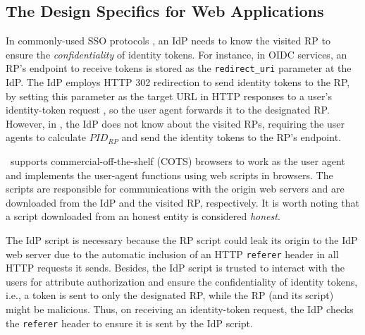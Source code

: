 \subsection{The Design Specifics for Web Applications}
\label{sec:web-design}

In commonly-used SSO protocols \cite{OpenIDConnect,rfc6749, SAML, SAMLIdentifier},
an IdP needs to know the visited RP to ensure the \emph{confidentiality} of identity tokens. For instance, in OIDC services, an RP's endpoint to receive tokens is stored as the \verb+redirect_uri+ parameter at the IdP. The IdP employs HTTP 302 redirection to send identity tokens to the RP, by setting this parameter as the target URL in HTTP responses to a user's identity-token request \cite{OpenIDConnect}, so the user agent forwards it to the designated RP.
However, in \usso, the IdP does not know about the visited RPs, requiring the user agents to calculate $PID_{RP}$ and send the identity tokens to the RP's endpoint.

\usso~supports commercial-off-the-shelf (COTS) browsers to work as the user agent and implements the user-agent functions using web scripts in browsers. The scripts are responsible for communications with the origin web servers and are downloaded from the IdP and the visited RP, respectively. It is worth noting that a script downloaded from an honest entity is considered \emph{honest}.

The IdP script is necessary because the RP script could leak its origin to the IdP web server due to the automatic inclusion of an HTTP \verb+referer+ header in all HTTP requests it sends.
Besides, the IdP script is trusted to interact with the users for attribute authorization and ensure the confidentiality of identity tokens, i.e., a token is sent to only the designated RP, while the RP (and its script) might be malicious. Thus, on receiving an identity-token request, the IdP checks the \verb+referer+ header to ensure it is sent by the IdP script.

